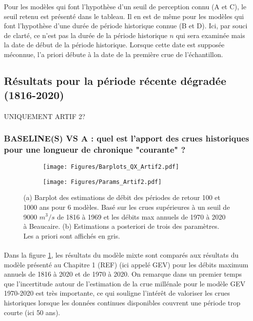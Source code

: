 \documentclass[11pt]{article}
\begin{document}
	Pour les modèles qui font l'hypothèse d'un seuil de perception connu (A et C), le seuil retenu est présenté dans le tableau. Il en est de même pour les modèles qui font l'hypothèse d'une durée de période historique connue (B et D). Ici, par souci de clarté, ce n'est pas la durée de la période historique $n$ qui sera examinée mais la date de début de la période historique. Lorsque cette date est supposée méconnue, l'a priori débute à la date de la première crue de l'échantillon.
			
	\FloatBarrier	
	
	\subsection{Résultats pour la période récente dégradée (1816-2020)}
	
	\paragraph{} 
	
	UNIQUEMENT ARTIF 2? 
	
	\subsubsection{BASELINE(S) VS A : quel est l'apport des crues historiques pour une longueur de chronique "courante" ?}

\begin{figure}[h]
        \centering
        \begin{subfigure}{.8\textwidth}
                \texttt{[image: Figures/Barplots\_QX\_Artif2.pdf]}
                \caption{}
                \label{subfig:Barplot_Artif2}
        \end{subfigure}
        \centering
        \begin{subfigure}{\textwidth}
                \texttt{[image: Figures/Params\_Artif2.pdf]}
                \caption{}
                \label{subfig:Params_Artif2}
        \end{subfigure}
        \caption{(a) Barplot des estimations de débit des périodes de retour 100 et 1000 ans pour 6 modèles. Basé sur les crues supérieures à un seuil de 9000 $m^3/s$ de 1816 à 1969 et les débits max annuels de 1970 à 2020 à Beaucaire. (b) Estimations a posteriori de trois des paramètres. Les a priori sont affichés en gris.}
\end{figure}

	\paragraph{} Dans la figure \ref{subfig:Barplot_Artif2}, les résultats du modèle mixte sont comparés aux résultats du modèle présenté au Chapitre 1 (REF) (ici appelé GEV) pour les débits maximum annuels de 1816 à 2020 et de 1970 à 2020. On remarque dans un premier temps que l'incertitude autour de l'estimation de la crue millénale pour le modèle GEV 1970-2020 est très importante, ce qui souligne l'intérêt de valoriser les crues historiques lorsque les données continues disponibles couvrent une période trop courte (ici 50 ans). 
\end{document}
